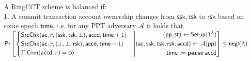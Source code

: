 \begin{definition}[Balance] A RingCCT scheme is balanced if: \\
	1. A commit transaction account ownership changes from $\mathsf{ssk}, \mathsf{tsk}$ to $\mathsf{rsk}$ based on some epoch $\mathsf{time}$, i.e. for any PPT adversary $\mathcal{A}$ it holds that \\
$\mathsf{Pr}\left[
    \begin{cases} 
	\mathsf{SrcChk}(\mathsf{ac}, r, (\mathsf{ssk}, \mathsf{tsk}, \perp), \mathsf{accd}, \mathsf{time}+1) \tabularnewline 
	\mathsf{SrcChk}(\mathsf{ac}, r, (\perp, \perp, \mathsf{rsk}), \mathsf{accd}, \mathsf{time}-1) \tabularnewline
        \Gamma.\mathsf{Com}(\mathsf{accd}, r) = \mathsf{co} 
    \end{cases} 
    \middle|(
    \begin{aligned}
	(\mathsf{pp}, \mathsf{st}) \gets \mathsf{Setup}(1^\lambda) \\
	\mathsf{ac}, \mathsf{ssk}, \mathsf{tsk}, \mathsf{rsk}, \mathsf{accd}) \gets \mathcal{A}(\mathsf{pp}) \\
    	\mathsf{time} := \mathbf{parse} \: \mathsf{accd} \\
    \end{aligned}
\right]
\leq \negl
$
\end{definition}


